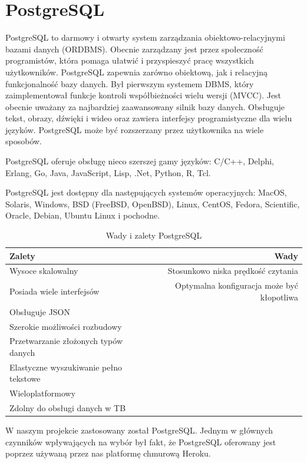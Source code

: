 \documentclass[oneside,polski,logo,indent]{amuthesis}
\begin{document}
\section{PostgreSQL}
PostgreSQL to darmowy i otwarty system zarządzania obiektowo-relacyjnymi bazami danych (ORDBMS). Obecnie zarządzany jest przez społeczność programistów, która pomaga ułatwić i przyspieszyć  pracę wszystkich użytkowników.
PostgreSQL zapewnia zarówno obiektową, jak i relacyjną funkcjonalność bazy danych. Był pierwszym systemem DBMS, który zaimplementował funkcje kontroli współbieżności wielu wersji (MVCC). Jest obecnie uważany za najbardziej zaawansowany silnik bazy danych. Obsługuje tekst, obrazy, dźwięki i wideo oraz zawiera interfejsy programistyczne dla wielu języków. PostgreSQL może być rozszerzany przez użytkownika na wiele sposobów.


PostgreSQL oferuje obsługę nieco szerszej gamy języków: C/C++, Delphi, Erlang, Go, Java, JavaScript, Lisp, .Net, Python, R, Tcl.

PostgreSQL jest dostępny dla następujących systemów operacyjnych: MacOS, Solaris, Windows, BSD (FreeBSD, OpenBSD), Linux, CentOS, Fedora, Scientific, Oracle, Debian, Ubuntu Linux i pochodne.

\begin{table}[H]
\caption{Wady i zalety PostgreSQL}
\label{tabela-PostgreSQL}
\centering
\begin{adjustbox}{width=1\textwidth}
\small
\begin{tabular}{lr}
\toprule
Zalety & Wady\\
\midrule
Wysoce skalowalny & Stosunkowo niska prędkość czytania\\ 
Posiada wiele interfejsów & Optymalna konfiguracja może być kłopotliwa\\ 
Obsługuje JSON &  \\ 
Szerokie możliwości rozbudowy &  \\ 
Przetwarzanie złożonych typów danych &  \\ 
Elastyczne wyszukiwanie pełno tekstowe  &  \\ 
Wieloplatformowy &  \\ 
Zdolny do obsługi danych w TB &  \\ 
\bottomrule
\end{tabular}
\end{adjustbox}
\end{table}
  

W naszym projekcie zastosowany został PostgreSQL. Jednym w głównych czynników wpływających na wybór był fakt, że PostgreSQL oferowany jest poprzez używaną przez nas platformę chmurową Heroku. 
\end{document}
